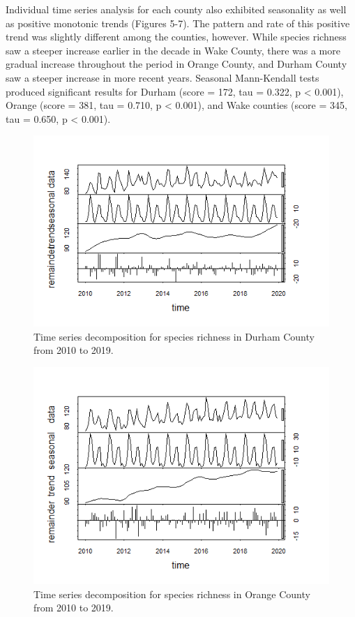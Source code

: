 \documentclass[
  12pt,
]{article}
\begin{document}
Individual time series analysis for each county also exhibited
seasonality as well as positive monotonic trends (Figures 5-7). The
pattern and rate of this positive trend was slightly different among the
counties, however. While species richness saw a steeper increase earlier
in the decade in Wake County, there was a more gradual increase
throughout the period in Orange County, and Durham County saw a steeper
increase in more recent years. Seasonal Mann-Kendall tests produced
significant results for Durham (score = 172, tau = 0.322, p \textless{}
0.001), Orange (score = 381, tau = 0.710, p \textless{} 0.001), and Wake
counties (score = 345, tau = 0.650, p \textless{} 0.001).

\begin{figure}
\centering
\includegraphics{./Output/Durham_spp_ts_decomp.png}
\caption{Time series decomposition for species richness in Durham County
from 2010 to 2019.}
\end{figure}

\begin{figure}
\centering
\includegraphics{./Output/Orange_spp_ts_decomp.png}
\caption{Time series decomposition for species richness in Orange County
from 2010 to 2019.}
\end{figure}
\end{document}
